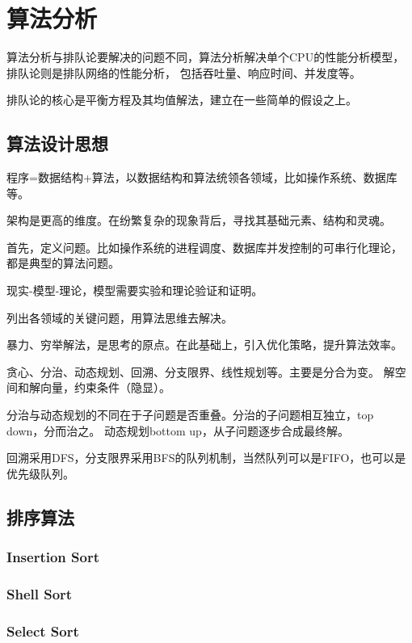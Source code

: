 \chapter{算法分析}

算法分析与排队论要解决的问题不同，算法分析解决单个CPU的性能分析模型，排队论则是排队网络的性能分析，
包括吞吐量、响应时间、并发度等。

排队论的核心是平衡方程及其均值解法，建立在一些简单的假设之上。

\section{算法设计思想}

程序=数据结构+算法，以数据结构和算法统领各领域，比如操作系统、数据库等。

架构是更高的维度。在纷繁复杂的现象背后，寻找其基础元素、结构和灵魂。

首先，定义问题。比如操作系统的进程调度、数据库并发控制的可串行化理论，
都是典型的算法问题。

现实-模型-理论，模型需要实验和理论验证和证明。

列出各领域的关键问题，用算法思维去解决。

暴力、穷举解法，是思考的原点。在此基础上，引入优化策略，提升算法效率。

贪心、分治、动态规划、回溯、分支限界、线性规划等。主要是分合为变。
解空间和解向量，约束条件（隐显）。

分治与动态规划的不同在于子问题是否重叠。分治的子问题相互独立，top down，分而治之。
动态规划bottom up，从子问题逐步合成最终解。

回溯采用DFS，分支限界采用BFS的队列机制，当然队列可以是FIFO，也可以是优先级队列。

\section{排序算法}

\subsection{Insertion Sort}

\subsection{Shell Sort}

\subsection{Select Sort}

